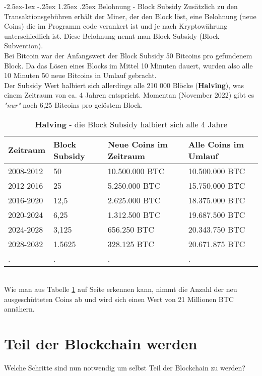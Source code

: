 \documentclass[10pt,a4paper,titlepage]{article}
\makeatletter
\renewcommand\paragraph{\@startsection{paragraph}{4}{\z@}%
            {-2.5ex\@plus -1ex \@minus -.25ex}%
            {1.25ex \@plus .25ex}%
            {\normalfont\normalsize\bfseries}}
\makeatother
\begin{document}
\paragraph{Belohnung - Block Subsidy}
Zusätzlich zu den Transaktionsgebühren
erhält der Miner, der den Block löst, eine Belohnung (neue Coins) die im Programm code verankert ist und je nach Kryptowährung unterschiedlich ist. Diese Belohnung nennt man Block Subsidy (Block-Subvention).\\
Bei Bitcoin war der Anfangswert der Block Subsidy 50 Bitcoins pro gefundenem Block. Da das Lösen eines Blocks im Mittel 10 Minuten dauert, wurden also alle 10 Minuten 50 neue Bitcoins in Umlauf gebracht.\\
Der Subsidy Wert halbiert sich allerdings alle 210 000 Blöcke (\textbf{Halving}), was einem Zeitraum von ca. 4 Jahren entspricht. Momentan (November 2022) gibt es \textit{"nur"} noch 6,25 Bitcoins pro gelöstem Block.
\begin{table}[h]
\centering
\begin{tabular}{|p{2cm}|p{2.5cm}|p{3.8cm}|p{3.7cm}|}
\hline 
\textbf{Zeitraum} &	\textbf{Block Subsidy} & \textbf{Neue Coins im Zeitraum} & \textbf{Alle Coins im Umlauf} \\
\hline 
2008-2012 & 50 & 10.500.000 BTC & 10.500.000 BTC\\
\hline
2012-2016 & 25 & 5.250.000 BTC & 15.750.000 BTC\\
\hline
2016-2020 & 12,5 & 2.625.000 BTC & 18.375.000 BTC\\
\hline
2020-2024 & 6,25 & 1.312.500 BTC & 19.687.500 BTC\\
\hline
2024-2028 & 3,125 & 656.250 BTC & 20.343.750 BTC\\
\hline
2028-2032 & 1.5625 & 328.125 BTC & 20.671.875 BTC\\
\hline 
. & . & . & .\\
\hline 
\end{tabular}
\caption{\textbf{Halving} - die Block Subsidy halbiert sich alle 4 Jahre}
\label{tabelle_1} 
\end{table}\\ 
Wie man aus Tabelle \ref{tabelle_1} auf Seite \pageref{tabelle_1} erkennen kann, nimmt die Anzahl der neu ausgeschütteten Coins ab und wird sich einen Wert von 21 Millionen BTC 
annähern.

\section{Teil der Blockchain werden}
Welche Schritte sind nun notwendig um selbst Teil der Blockchain zu werden?
\end{document}
